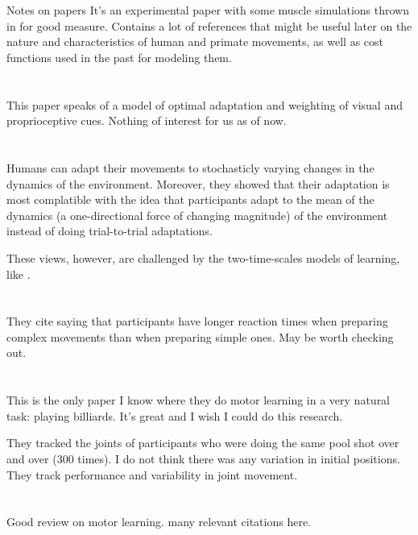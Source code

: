 \documentclass{report}
\begin{document}
\begin{chapter}{Notes on papers}
It's an experimental paper with some muscle simulations thrown in for good
measure. Contains a lot of references that might be useful later on the nature
and characteristics of human and primate movements, as well as cost functions
used in the past for modeling them.

\section{\cite{Beers_When_2002}}
This paper speaks of a model of optimal adaptation and weighting of visual and
proprioceptive cues. Nothing of interest for us as of now.

\section{\cite{Scheidt_Learning_2001}}
Humans can adapt their movements to stochasticly varying changes in the dynamics
of the environment. Moreover, they showed that their adaptation is most
complatible with the idea that participants adapt to the mean of the dynamics (a
one-directional force of changing magnitude) of the environment instead of doing
trial-to-trial adaptations.

These views, however, are challenged by the two-time-scales models of learning,
like \cite{Smith_Interacting_2006}.

\section{\cite{DeKleijn_Everyday_2014}}
They cite \cite{Henry_Increased_1960} saying that participants have longer
reaction times when preparing complex movements than when preparing simple
ones. May be worth checking out.

\section{\cite{Haar_Motor_2020}}
This is the only paper I know where they do motor learning in a very natural
task: playing billiards. It's great and I wish I could do this research.

They tracked the joints of participants who were doing the same pool shot over
and over (300 times). I do not think there was any variation in initial
positions. They track performance and variability in joint movement.

\section{\cite{Wolpert_Principles_2011}}
Good review on motor learning. many relevant citations here.


\end{chapter}
\end{document}
